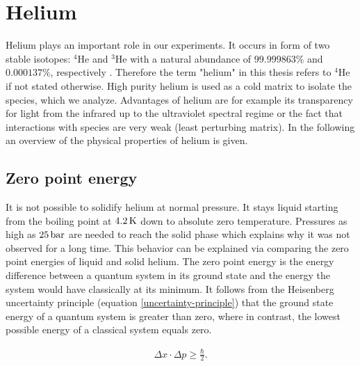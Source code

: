 \documentclass[parskip,12pt,headsepline,a4paper] {scrbook}
\begin{document}
\section{Helium}
\vspace{-0.5\baselineskip}
Helium plays an important role in our experiments. It occurs in form of two stable isotopes: $^4$He and $^3$He with a natural abundance of $99.999863 \%$ and $0.000137 \%$, respectively \cite{crc}. Therefore the term "helium" in this thesis refers to $^4$He if not stated otherwise. High purity helium is used as a cold matrix to isolate the species, which we analyze. Advantages of helium are for example its transparency for light from the infrared up to the ultraviolet spectral regime or the fact that interactions with species are very weak (least perturbing matrix). In the following an overview of the physical properties of helium is given.

\subsection{Zero point energy}
\vspace{-1\baselineskip}
It is not possible to solidify helium at normal pressure. It stays liquid starting from the boiling point at $\unit[4.2]{K}$ down to absolute zero temperature. Pressures as high as $\unit[25]{bar}$ are needed to reach the solid phase which explains why it was not observed for a long time. This behavior can be explained via comparing the zero point energies of liquid and solid helium. The zero point energy is the energy difference between a quantum system in its ground state and the energy the system would have classically at its minimum. It follows from the Heisenberg uncertainty principle (equation \ref{uncertainty-principle}) that the ground state energy of a quantum system is greater than zero, where in contrast, the lowest possible energy of a classical system equals zero.

\begin{align}  \label{uncertainty-principle}
\Delta x \cdot \Delta p \ge \frac{\hbar}{2} .
\end{align}
\end{document}
